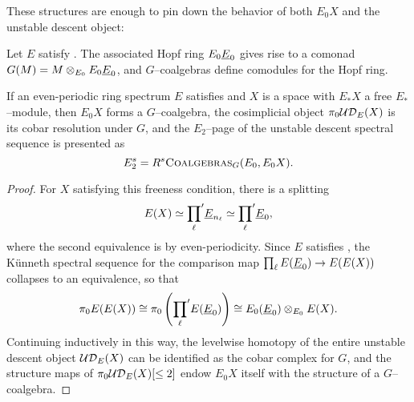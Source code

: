 These structures are enough to pin down the behavior of both \(E_0 X\) and the unstable descent object:

\begin{definition}
Let \(E\) satisfy {\UFH}.  The associated Hopf ring \(E_0 \OS{E}{0}\) gives rise to a comonad \(G(M) = M \otimes_{E_0} E_0 \OS{E}{0}\), and \(G\)--coalgebras define comodules for the Hopf ring.
\end{definition}

\begin{lemma}\label{HopfRingFromOneRingSpectrum}
If an even-periodic ring spectrum \(E\) satisfies {\UFH} and \(X\) is a space with \(E_* X\) a free \(E_*\)--module, then \(E_0 X\) forms a \(G\)--coalgebra, the cosimplicial object \(\pi_0 \mathcal{UD}_E(X)\) is its cobar resolution under \(G\), and the \(E_2\)--page of the unstable descent spectral sequence is presented as \[E_2^{s} = R^s\normalfont\textsc{Coalgebras}_G(E_0, E_0 X).\]
\end{lemma}
\begin{proof}
For \(X\) satisfying this freeness condition, there is a splitting \[E(X) \simeq {\prod_\ell}' \OS{E}{n_\ell} \simeq {\prod_\ell}' \OS{E}{0},\] where the second equivalence is by even-periodicity.  Since \(E\) satisfies {\UFH}, the K\"unneth spectral sequence for the comparison map \(\prod_\ell E(\OS{E}{0}) \to E(E(X))\) collapses to an equivalence, so that \[\pi_0 E(E(X)) \cong \pi_0 \left({\prod_\ell}' E(\OS{E}{0})\right) \cong E_0(\OS{E}{0}) \otimes_{E_0} E(X).\]  Continuing inductively in this way, the levelwise homotopy of the entire unstable descent object \(\mathcal{UD}_E(X)\) can be identified as the cobar complex for \(G\), and the structure maps of \(\pi_0 \mathcal{UD}_E(X)[\le 2]\) endow \(E_0 X\) itself with the structure of a \(G\)--coalgebra.
\end{proof}

